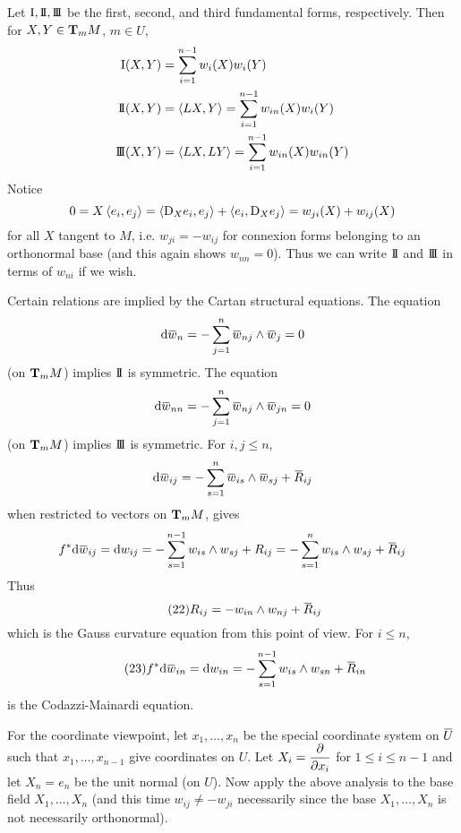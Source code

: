 \documentclass[../main]{subfiles}
\begin{document}
Let $\firstForm,\secondForm,\thirdForm$ be the first, second, and third fundamental forms, respectively. Then for $X,Y\in\ts Mm$, $m\in U$,
\begin{align*}
    \firstForm(X,Y) &= \sum_{i=1}^{n-1} w_i(X)w_i(Y) \\
    \secondForm(X,Y) &= \ip{LX}{Y} = \sum_{i=1}^{n-1} w_{in}(X)w_i(Y) \\
    \thirdForm(X,Y) &= \ip{LX}{LY} = \sum_{i=1}^{n-1} w_{in}(X)w_{in}(Y)
\end{align*}
Notice
\[0 = X\ip{e_i}{e_j} = \ip{\D_Xe_i}{e_j} + \ip{e_i}{\D_Xe_j} = w_{ji}(X) + w_{ij}(X)\]
for all $X$ tangent to $M$, i.e. $w_{ji}=-w_{ij}$ for connexion forms belonging to an orthonormal base (and this again shows $w_{nn}=0$). Thus we can write $\secondForm$ and $\thirdForm$ in terms of $w_{ni}$ if we wish.

Certain relations are implied by the Cartan structural equations. The equation
\[\dd\xoverline w_n = -\sum_{j=1}^n\xoverline w_{nj}\wedge\xoverline w_j = 0\]
(on $\ts Mm$) implies $\secondForm$ is symmetric. The equation
\[\dd\xoverline w_{nn} = -\sum_{j=1}^n\xoverline w_{nj}\wedge\xoverline w_{jn} = 0\]
(on $\ts Mm$) implies $\thirdForm$ is symmetric. For $i,j\le n$,
\[\dd\xoverline w_{ij} = -\sum_{s=1}^n\xoverline w_{is}\wedge\xoverline w_{sj} + \xoverline R_{ij}\]
when restricted to vectors on $\ts Mm$, gives
\[f^*\dd\xoverline w_{ij} = \dd w_{ij}
= -\sum_{s=1}^{n-1} w_{is}\wedge w_{sj} + R_{ij}
= -\sum_{s=1}^n w_{is}\wedge w_{sj} + \xoverline R_{ij}\]
Thus
\begin{equation}\tag{22} \label{eqn:ch6.6.5}
    R_{ij} = -w_{in}\wedge w_{nj} + \xoverline R_{ij}
\end{equation}
which is the Gauss curvature equation from this point of view. For $i\le n$,
\begin{equation}\tag{23} \label{eqn:6.23}
    f^*\dd\xoverline w_{in} = \dd w_{in} = -\sum_{s=1}^{n-1} w_{is}\wedge w_{sn} + \xoverline R_{in}
\end{equation}
is the Codazzi-Mainardi equation.

For the coordinate viewpoint, let $x_1,\ldots,x_n$ be the special coordinate system on $\xoverline U$ such that $x_1,\ldots,x_{n-1}$ give coordinates on $U$. Let $X_i=\pdv{}{x_i}$ for $1\le i\le n-1$ and let $X_n=e_n$ be the unit normal (on $U$). Now apply the above analysis to the base field $X_1,\ldots,X_n$ (and this time  $w_{ij}\ne -w_{ji}$ necessarily since the base $X_1,\ldots,X_n$ is not necessarily orthonormal).
\end{document}
